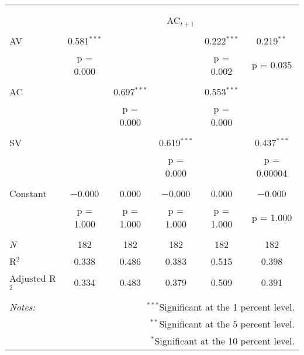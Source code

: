 
\begin{tabular}{@{\extracolsep{5pt}}lccccc} 
\\[-1.8ex]\hline 
\hline \\[-1.8ex] 
\\[-1.8ex] & \multicolumn{5}{c}{AC$_{t+1}$} \\ 
\hline \\[-1.8ex] 
 AV & 0.581$^{***}$ &  &  & 0.222$^{***}$ & 0.219$^{**}$ \\ 
  & p = 0.000 &  &  & p = 0.002 & p = 0.035 \\ 
  & & & & & \\ 
 AC &  & 0.697$^{***}$ &  & 0.553$^{***}$ &  \\ 
  &  & p = 0.000 &  & p = 0.000 &  \\ 
  & & & & & \\ 
 SV &  &  & 0.619$^{***}$ &  & 0.437$^{***}$ \\ 
  &  &  & p = 0.000 &  & p = 0.00004 \\ 
  & & & & & \\ 
 Constant & $-$0.000 & 0.000 & $-$0.000 & 0.000 & $-$0.000 \\ 
  & p = 1.000 & p = 1.000 & p = 1.000 & p = 1.000 & p = 1.000 \\ 
  & & & & & \\ 
\textit{N} & 182 & 182 & 182 & 182 & 182 \\ 
R$^{2}$ & 0.338 & 0.486 & 0.383 & 0.515 & 0.398 \\ 
Adjusted R$^{2}$ & 0.334 & 0.483 & 0.379 & 0.509 & 0.391 \\ 
\hline 
\hline \\[-1.8ex] 
\textit{Notes:} & \multicolumn{5}{r}{$^{***}$Significant at the 1 percent level.} \\ 
 & \multicolumn{5}{r}{$^{**}$Significant at the 5 percent level.} \\ 
 & \multicolumn{5}{r}{$^{*}$Significant at the 10 percent level.} \\ 
\end{tabular} 
